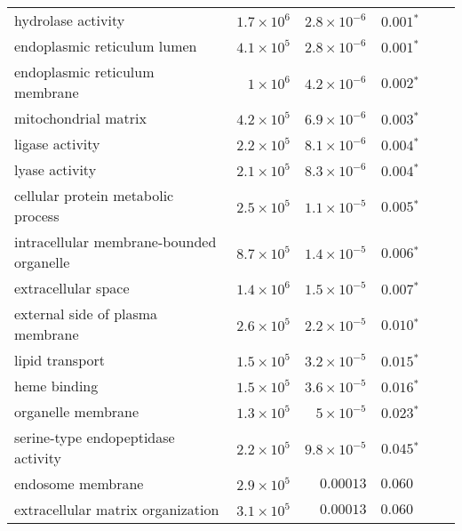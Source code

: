 \begin{longtable}{|l|r|r|r|r|r|}
                        hydrolase activity & $1.7\times 10^{6}$ &  $2.8\times 10^{-6}$ &              $\bm{ 0.001{^*}}$ \\
               endoplasmic reticulum lumen & $4.1\times 10^{5}$ &  $2.8\times 10^{-6}$ &              $\bm{ 0.001{^*}}$ \\
            endoplasmic reticulum membrane &  $ 1\times 10^{6}$ &  $4.2\times 10^{-6}$ &              $\bm{ 0.002{^*}}$ \\
                      mitochondrial matrix & $4.2\times 10^{5}$ &  $6.9\times 10^{-6}$ &              $\bm{ 0.003{^*}}$ \\
                           ligase activity & $2.2\times 10^{5}$ &  $8.1\times 10^{-6}$ &              $\bm{ 0.004{^*}}$ \\
                            lyase activity & $2.1\times 10^{5}$ &  $8.3\times 10^{-6}$ &              $\bm{ 0.004{^*}}$ \\
        cellular protein metabolic process & $2.5\times 10^{5}$ &  $1.1\times 10^{-5}$ &              $\bm{ 0.005{^*}}$ \\
  intracellular membrane-bounded organelle & $8.7\times 10^{5}$ &  $1.4\times 10^{-5}$ &              $\bm{ 0.006{^*}}$ \\
                       extracellular space & $1.4\times 10^{6}$ &  $1.5\times 10^{-5}$ &              $\bm{ 0.007{^*}}$ \\
          external side of plasma membrane & $2.6\times 10^{5}$ &  $2.2\times 10^{-5}$ &              $\bm{ 0.010{^*}}$ \\
                           lipid transport & $1.5\times 10^{5}$ &  $3.2\times 10^{-5}$ &              $\bm{ 0.015{^*}}$ \\
                              heme binding & $1.5\times 10^{5}$ &  $3.6\times 10^{-5}$ &              $\bm{ 0.016{^*}}$ \\
                        organelle membrane & $1.3\times 10^{5}$ &   $ 5\times 10^{-5}$ &              $\bm{ 0.023{^*}}$ \\
        serine-type endopeptidase activity & $2.2\times 10^{5}$ &  $9.8\times 10^{-5}$ &              $\bm{ 0.045{^*}}$ \\
                         endosome membrane & $2.9\times 10^{5}$ &            $0.00013$ &                     $ 0.060~~$ \\
         extracellular matrix organization & $3.1\times 10^{5}$ &            $0.00013$ &                     $ 0.060~~$ \\

\end{longtable}
